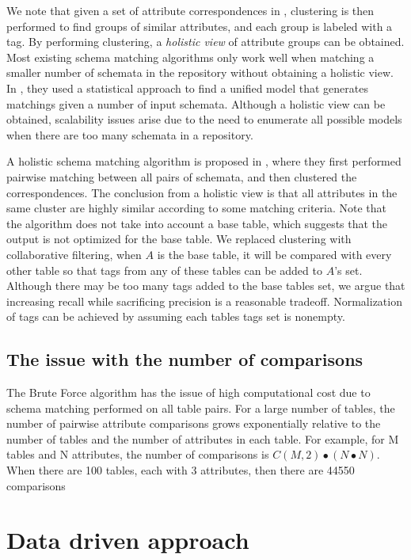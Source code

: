 We note that given a set of attribute correspondences in \cite{Smith2011Unity}, clustering is then performed to find groups of similar attributes, and each group is labeled with a tag. By performing clustering, a \textit{holistic view} of attribute groups can be obtained. Most existing schema matching algorithms only work well when matching a smaller number of schemata in the repository without obtaining a holistic view. In \cite{10.1145/2396761.2398468}, they used a statistical approach to find a unified model that generates matchings given a number of input schemata. Although a holistic view can be obtained, scalability issues arise due to the need to enumerate all possible models when there are too many schemata in a repository.

A holistic schema matching algorithm is proposed in \cite{Rahm2016Case}, where they first performed pairwise matching between all pairs of schemata, and then clustered the correspondences. The conclusion from a holistic view is that all attributes in the same cluster are highly similar according to some matching criteria. Note that the algorithm does not take into account a base table, which suggests that the output is not optimized for the base table. We replaced clustering with collaborative filtering, when $A$ is the base table, it will be compared with every other table so that tags from any of these tables can be added to $A$'s set. Although there may be too many tags added to the base tables set, we argue that increasing recall while sacrificing precision is a reasonable tradeoff. Normalization of tags can be achieved by assuming each tables tags set is nonempty.

\subsection{The issue with the number of comparisons}

The Brute Force algorithm has the issue of high computational cost due to schema matching performed on all table pairs. For a large number of tables, the number of pairwise attribute comparisons grows exponentially relative to the number of tables and the number of attributes in each table. For example, for M tables and N attributes, the number of comparisons is $C(M,2)\bullet(N\bullet N)$. When there are 100 tables, each with 3 attributes, then there are 44550 comparisons

\section{Data driven approach}
\label{sec:DataDrivenApproach}

